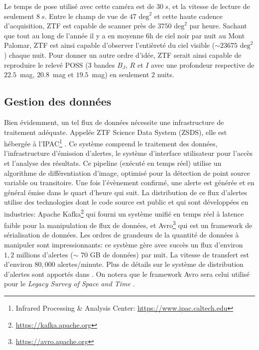 \documentclass[../main/main.tex]{subfiles}
\begin{document}
Le temps de pose utilisé avec cette caméra est de $\SI{30}{s}$, et la vitesse
de lecture de seulement $\SI{8}{s}$. Entre le champ de vue de
$47\text{ deg}^{2}$ et cette haute cadence d'acquisition, ZTF est capable
de scanner près de $3750\text{ deg}^{2}$ par heure. Sachant que tout au long
de l'année il y a en moyenne 6h de ciel noir par nuit au Mont Palomar, ZTF est ainsi
capable d'observer l'entièreté du ciel visible ($\sim23675\text{ deg}^{2}$) chaque nuit. Pour donner un autre
ordre d'idée, ZTF serait ainsi capable de reproduire le relevé POSS
\citep{MinkowskiPOSS} ($3$ bandes $B_J$, $R$ et $I$ avec une profondeur
respective de $22.5$~mag, $20.8$~mag et $19.5$~mag) en seulement 2 nuits.


\subsection{Gestion des données}

Bien évidemment, un tel flux de données nécessite une infrastructure de
traitement adéquate. Appelée ZTF Science Data System (ZSDS), elle 
est hébergée à l'IPAC\footnote{Infrared Processing \& Analysis Center: \href{https://
www.ipac.caltech.edu}{https://www.ipac.caltech.edu}} \citep{MasciZTF2019}. Ce système
comprend le traitement des données, l'infrastructure
d'émission d'alertes, le système d'interface utilisateur pour l'accès
et l'analyse des résultats. Ce pipeline (exécuté en temps réel) utilise
un algorithme de différentiation d'image, optimisé pour la détection de
point source variable ou transitoire. Une fois l'évènement confirmé, une alerte est générée et
en général émise dans le quart d'heure qui suit. La distribution de
ce flux d'alertes utilise des technologies dont le code source est
public et qui sont développées
en industries: Apache Kafka\footnote{\url{https://kafka.apache.org}} qui
fourni un système unifié en temps réel à latence faible pour la
manipulation de flux de données, et
Avro\footnote{\url{https://avro.apache.org}} qui est un framework de
sérialisation de données. Les ordres de grandeurs de la quantité de
données à manipuler sont impressionnants: ce système gère avec succès un
flux d'environ $1,2$ millions d'alertes ($\sim$ $70$ GB de données) par
nuit. La vitesse de transfert est d'environ $80,000$ alertes/minute. Plus
de détails sur le système de distribution d'alertes sont apportés dans
\citet{PattersonZTF2019}. On notera que le framework Avro sera celui utilisé
pour le \textit{Legacy Survey of Space and Time} \citep[LSST;][]{LSSTbook2}.
\end{document}

